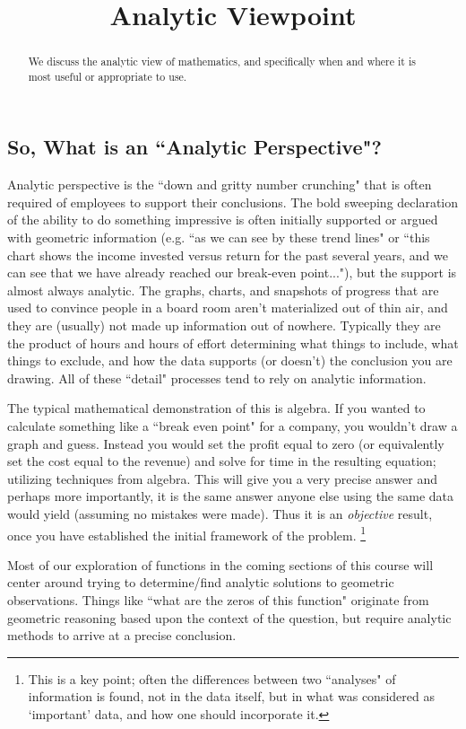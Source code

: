 \documentclass{ximeraXloud}
\title{Analytic Viewpoint}
\begin{document}
\begin{abstract}
    We discuss the analytic view of mathematics, and specifically when and where it is most useful or appropriate to use.
\end{abstract}
\maketitle

\subsection*{So, What is an ``Analytic Perspective"?}
    Analytic perspective is the ``down and gritty number crunching" that is often required of employees to support their conclusions. The bold sweeping declaration of the ability to do something impressive is often initially supported or argued with geometric information (e.g. ``as we can see by these trend lines" or ``this chart shows the income invested versus return for the past several years, and we can see that we have already reached our break-even point..."), but the support is almost always analytic. The graphs, charts, and snapshots of progress that are used to convince people in a board room aren't materialized out of thin air, and they are (usually) not made up information out of nowhere. Typically they are the product of hours and hours of effort determining what things to include, what things to exclude, and how the data supports (or doesn't) the conclusion you are drawing. All of these ``detail" processes tend to rely on analytic information.
    
    The typical mathematical demonstration of this is algebra. If you wanted to calculate something like a ``break even point" for a company, you wouldn't draw a graph and guess. Instead you would set the profit equal to zero (or equivalently set the cost equal to the revenue) and solve for time in the resulting equation; utilizing techniques from algebra. This will give you a very precise answer and perhaps more importantly, it is the same answer anyone else using the same data would yield (assuming no mistakes were made). Thus it is an \textit{objective} result, once you have established the initial framework of the problem.%
    \footnote{%
        This is a key point; often the differences between two ``analyses" of information is found, not in the data itself, but in what was considered as `important' data, and how one should incorporate it.%
        }
    
    Most of our exploration of functions in the coming sections of this course will center around trying to determine/find analytic solutions to geometric observations. Things like ``what are the zeros of this function" originate from geometric reasoning based upon the context of the question, but require analytic methods to arrive at a precise conclusion.
    
\end{document}
